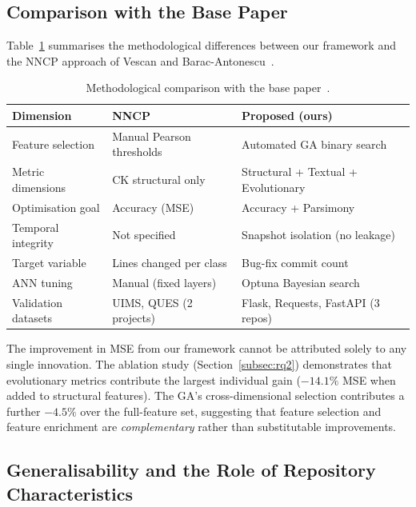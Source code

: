 \documentclass[11pt,a4paper]{article}
\begin{document}
\subsection{Comparison with the Base Paper}

Table~\ref{tab:comparison} summarises the methodological differences between
our framework and the NNCP approach of Vescan and Barac-Antonescu~\cite{vescan2025}.

\begin{table}[!htbp]
\centering
\caption{Methodological comparison with the base paper~\cite{vescan2025}.}
\label{tab:comparison}
\renewcommand{\arraystretch}{1.2}
\begin{tabular}{@{}p{3.5cm}p{3.5cm}p{3.5cm}@{}}
\toprule
\textbf{Dimension} & \textbf{NNCP~\cite{vescan2025}} &
\textbf{Proposed (ours)} \\
\midrule
Feature selection    & Manual Pearson thresholds & Automated GA binary search \\
Metric dimensions    & CK structural only        & Structural + Textual + Evolutionary \\
Optimisation goal    & Accuracy (MSE)            & Accuracy + Parsimony \\
Temporal integrity   & Not specified             & Snapshot isolation (no leakage) \\
Target variable      & Lines changed per class   & Bug-fix commit count \\
ANN tuning           & Manual (fixed layers)     & Optuna Bayesian search \\
Validation datasets  & UIMS, QUES (2 projects)   & Flask, Requests, FastAPI (3 repos) \\
\bottomrule
\end{tabular}
\end{table}

The improvement in MSE from our framework cannot be attributed solely to any
single innovation. The ablation study (Section~\ref{subsec:rq2}) demonstrates
that evolutionary metrics contribute the largest individual gain ($-14.1\%$
MSE when added to structural features). The GA's cross-dimensional selection
contributes a further $-4.5\%$ over the full-feature set, suggesting that
feature selection and feature enrichment are \emph{complementary} rather than
substitutable improvements.

\subsection{Generalisability and the Role of Repository Characteristics}
\end{document}
